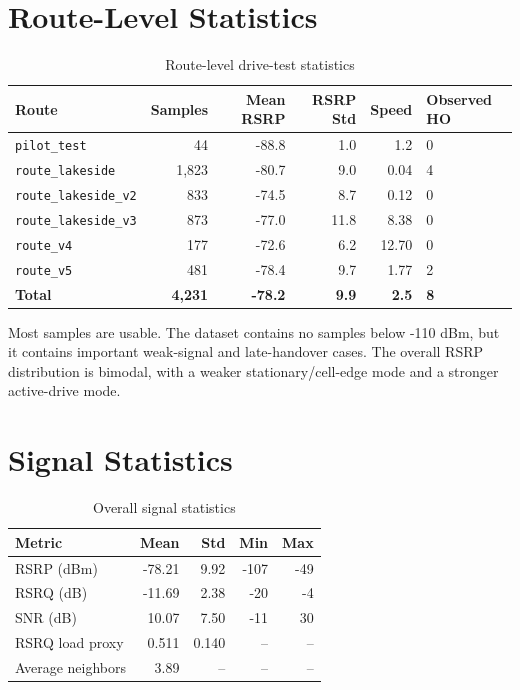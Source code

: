 \documentclass[12pt,a4paper]{report}
\begin{document}
\section{Route-Level Statistics}
\begin{table}[H]
\centering
\caption{Route-level drive-test statistics}
\begin{tabularx}{\textwidth}{p{}r r r r Y}
\toprule
\textbf{Route} & \textbf{Samples} & \textbf{Mean RSRP} & \textbf{RSRP Std} & \textbf{Speed} & \textbf{Observed HO}\\
\midrule
\texttt{pilot\_test} & 44 & -88.8 & 1.0 & 1.2 & 0\\
\texttt{route\_lakeside} & 1,823 & -80.7 & 9.0 & 0.04 & 4\\
\texttt{route\_lakeside\_v2} & 833 & -74.5 & 8.7 & 0.12 & 0\\
\texttt{route\_lakeside\_v3} & 873 & -77.0 & 11.8 & 8.38 & 0\\
\texttt{route\_v4} & 177 & -72.6 & 6.2 & 12.70 & 0\\
\texttt{route\_v5} & 481 & -78.4 & 9.7 & 1.77 & 2\\
\textbf{Total} & \textbf{4,231} & \textbf{-78.2} & \textbf{9.9} & \textbf{2.5} & \textbf{8}\\
\bottomrule
\end{tabularx}
\end{table}

Most samples are usable. The dataset contains no samples below -110 dBm, but it contains important weak-signal and late-handover cases. The overall RSRP distribution is bimodal, with a weaker stationary/cell-edge mode and a stronger active-drive mode.

\section{Signal Statistics}
\begin{table}[H]
\centering
\caption{Overall signal statistics}
\begin{tabularx}{\textwidth}{p{}r r r r}
\toprule
\textbf{Metric} & \textbf{Mean} & \textbf{Std} & \textbf{Min} & \textbf{Max}\\
\midrule
RSRP (dBm) & -78.21 & 9.92 & -107 & -49\\
RSRQ (dB) & -11.69 & 2.38 & -20 & -4\\
SNR (dB) & 10.07 & 7.50 & -11 & 30\\
RSRQ load proxy & 0.511 & 0.140 & -- & --\\
Average neighbors & 3.89 & -- & -- & --\\
\bottomrule
\end{tabularx}
\end{table}
\end{document}

